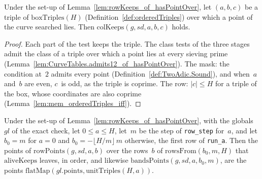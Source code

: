 \begin{lemma}\label{lem:colKeeps_of_hasPointOver}
  \leanok
  Under the set-up of Lemma~\ref{lem:rowKeeps_of_hasPointOver}, let $(a, b, c)$ be a triple of
  $\mathrm{boxTriples}(H)$ (Definition~\ref{def:orderedTriples}) over which a point of the curve
  searched lies. Then $\mathrm{colKeeps}(g, \mathit{sd}, a, b, c)$ holds.
\end{lemma}

\begin{proof}
  \leanok
  Each part of the test keeps the triple. The class tests of the three stages admit the class of
  a triple over which a point lies at every sieving prime
  (Lemma~\ref{lem:CurveTables.admits12_of_hasPointOver}). The mask: the condition at~$2$ admits
  every point (Definition~\ref{def:TwoAdic.Sound}), and when~$a$ and~$b$ are even, $c$~is odd, as
  the triple is coprime. The row: $|c| \le H$ for a triple of the box, whose coordinates are also
  coprime (Lemma~\ref{lem:mem_orderedTriples_iff}).
\end{proof}

\begin{lemma}\label{lem:flatMap_rowPoints_rowsFrom}
  \leanok
  Under the set-up of Lemma~\ref{lem:rowKeeps_of_hasPointOver}, with the globals $\mathit{gl}$ of
  the exact check, let $0 \le a \le H$, let~$m$ be the step of \texttt{row\_step} for~$a$, and let
  $b_0 = m$ for $a = 0$ and $b_0 = -\lfloor H/m \rfloor\, m$ otherwise, the first row of
  \texttt{run\_a}. Then the points of $\mathrm{rowPoints}(g, \mathit{sd}, a, b)$ over the rows~$b$
  of $\mathrm{rowsFrom}(b_0, m, H)$ that $\mathrm{aliveKeeps}$ leaves, in order, and likewise
  $\mathrm{bandsPoints}(g, \mathit{sd}, a, b_0, m)$, are the points
  $\mathrm{flatMap}(\mathit{gl}.\mathrm{points}, \mathrm{unitTriples}(H, a))$.
\end{lemma}

